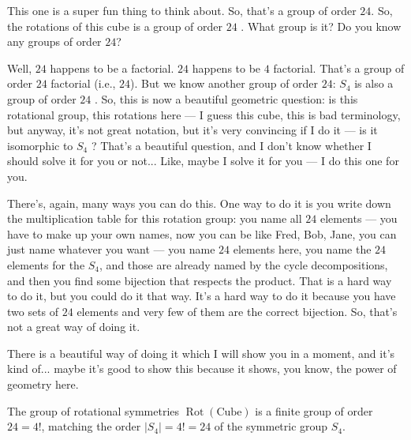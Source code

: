 \begin{speech}[00:36:39 - 00:38:42]
This one  is a super fun thing to think about. So, that's a group of order $24$. So, the rotations of this cube is a group of order $24$ . What group is it? Do you know any groups of order $24$?

Well, $24$ happens to be a factorial. $24$ happens to be $4$ factorial. That's a group of order $24$ factorial (i.e., $24$). But we know another group of order $24$: $S_4$ is also a group of order $24$ . So, this is now a beautiful geometric question: is this rotational group, this rotations here --- I guess this cube, this is bad terminology, but anyway, it's not great notation, but it's very convincing if I do it --- is it isomorphic to $S_4$ ? That's a beautiful question, and I don't know whether I should solve it for you or not... Like, maybe I solve it for you --- I do this one for you.

There's, again, many ways you can do this. One way to do it is you write down the multiplication table for this rotation group: you name all $24$ elements --- you have to make up your own names, now you can be like Fred, Bob, Jane, you can just name whatever you want --- you name $24$ elements here, you name the $24$ elements for the $S_4$, and those are already named by the cycle decompositions, and then you find some bijection that respects the product. That is a hard way to do it, but you could do it that way. It's a hard way to do it because you have two sets of $24$ elements and very few of them are the correct bijection. So, that's not a great way of doing it.

There is a beautiful way of doing it which I will show you in a moment, and it's kind of... maybe it's good to show this because it shows, you know, the power of geometry here.
\end{speech}

\begin{content}
The group of rotational symmetries $\operatorname{Rot}(\text{Cube})$ is a finite group of order $24 = 4!$, matching the order $|S_4| = 4! = 24$ of the symmetric group $S_4$.

\end{content}

